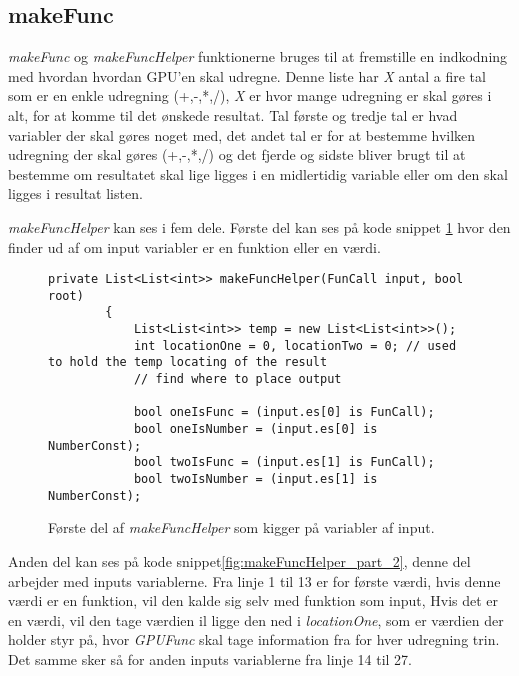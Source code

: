 \subsection{makeFunc}
\textit{makeFunc} og \textit{makeFuncHelper} funktionerne bruges til at fremstille en indkodning med hvordan hvordan GPU'en skal udregne. Denne liste har \textit{X} antal a fire tal som er en enkle udregning (+,-,*,/), \textit{X} er hvor mange udregning er skal gøres i alt, for at komme til det ønskede resultat. Tal første og tredje tal er hvad variabler der skal gøres noget med, det andet tal er for at bestemme hvilken udregning der skal gøres (+,-,*,/) og det fjerde og sidste bliver brugt til at bestemme om resultatet skal lige ligges i en midlertidig variable eller om den skal ligges i resultat listen.

\textit{makeFuncHelper} kan ses i fem dele. Første del kan ses på kode snippet \ref{fig:makeFuncHelper_part_1} hvor den finder ud af om input variabler er en funktion eller en værdi.

\begin{figure}[!ht]
    \centering
    \lstset{style=sharpc}
	\begin{lstlisting}
private List<List<int>> makeFuncHelper(FunCall input, bool root)
        {
            List<List<int>> temp = new List<List<int>>();
            int locationOne = 0, locationTwo = 0; // used to hold the temp locating of the result
            // find where to place output

            bool oneIsFunc = (input.es[0] is FunCall);
            bool oneIsNumber = (input.es[0] is NumberConst);
            bool twoIsFunc = (input.es[1] is FunCall);
            bool twoIsNumber = (input.es[1] is NumberConst);
	\end{lstlisting}
    \caption{Første del af \textit{makeFuncHelper} som kigger på variabler af input.}
    \label{fig:makeFuncHelper_part_1}
\end{figure}

Anden del kan ses på kode snippet\ref{fig:makeFuncHelper_part_2}, denne del arbejder med inputs variablerne. Fra linje 1 til 13 er for første værdi, hvis denne værdi er en funktion, vil den kalde sig selv med funktion som input, Hvis det er en værdi, vil den tage værdien il ligge den ned i \textit{locationOne}, som er værdien der holder styr på, hvor \textit{GPUFunc} skal tage information fra for hver udregning trin. Det samme sker så for anden inputs variablerne fra linje 14 til 27.

